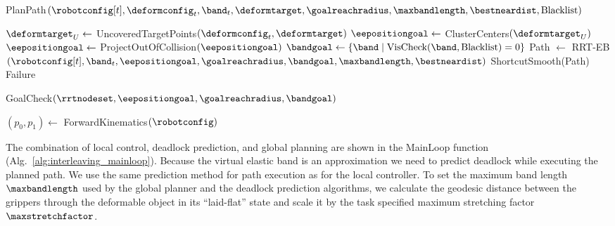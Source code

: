 \begin{algorithm}[t]
\caption{PlanPath$(\robotconfig[t], \deformconfig_t, \band_t, \deformtarget, \goalreachradius, \maxbandlength, \bestneardist, \textrm{Blacklist})$}
\begin{algorithmic}[1]
    \State $\deformtarget_U \gets$ UncoveredTargetPoints$(\deformconfig_t, \deformtarget)$
    \State $\eepositiongoal \gets$ ClusterCenters$(\deformtarget_U)$
    \State $\eepositiongoal \gets$ ProjectOutOfCollision$(\eepositiongoal)$
    \State $\bandgoal \gets \{\band \mid \text{VisCheck}(\band, \text{Blacklist}) = 0\}$
    \State Path $\gets$ RRT-EB$(\robotconfig[t], \band_t, \eepositiongoal, \goalreachradius, \bandgoal, \maxbandlength, \bestneardist)$
        \State \Return ShortcutSmooth(Path)
    \Else
        \State \Return Failure
    \EndIf
\end{algorithmic}
\label{alg:call_global_planner}
\end{algorithm}


\begin{algorithm}[t]
\caption{GoalCheck$(\rrtnodeset, \eepositiongoal, \goalreachradius, \bandgoal)$}
\begin{algorithmic}[1]
        \State $(p_0, p_1) \gets$ ForwardKinematics$(\robotconfig)$
            \State {}
        \EndIf
    \EndFor
    \State {}
\end{algorithmic}
\label{alg:goal_check}
\end{algorithm}




The combination of local control, deadlock prediction, and global planning are shown in the MainLoop function (Alg.~\ref{alg:interleaving_mainloop}). Because the virtual elastic band is an approximation we need to predict deadlock while executing the planned path. We use the same prediction method for path execution as for the local controller. To set the maximum band length $\maxbandlength$ used by the global planner and the deadlock prediction algorithms, we calculate the geodesic distance between the grippers through the deformable object in its ``laid-flat'' state and scale it by the task specified maximum stretching factor $\maxstretchfactor$.




